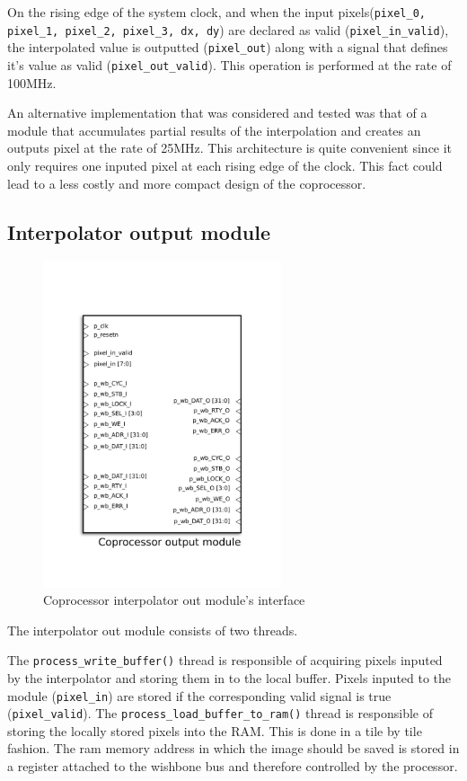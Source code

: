 On the rising edge of the system clock, and when the input pixels(\texttt{pixel\_0, pixel\_1, pixel\_2, pixel\_3, dx, dy}) are declared as valid (\texttt{pixel\_in\_valid}), the interpolated value is outputted (\texttt{pixel\_out}) along with a signal that defines it's value as valid (\texttt{pixel\_out\_valid}). 
This operation is performed at the rate of 100MHz.  


An alternative implementation that was considered and tested was that of a module that accumulates partial results of the interpolation and creates an outputs pixel at the rate of 25MHz. This architecture is quite convenient since it only requires one inputed pixel at each rising edge of the clock. This fact could lead to a less costly and more compact design of the coprocessor.  

\subsection{Interpolator output module}

\begin{figure}[H]
\center
\includegraphics[width=7cm]{figs/INTERPOLATOR_OUT.pdf}
\caption{Coprocessor interpolator out module's interface}
\label{interpo_out_ports}
\end{figure}



The interpolator out module consists of two threads. 

The \texttt{process\_write\_buffer()} thread is responsible of acquiring pixels inputed by the interpolator and storing them in to the local buffer. Pixels inputed to the module (\texttt{pixel\_in}) are stored if the corresponding valid signal is true (\texttt{pixel\_valid}). The \texttt{process\_load\_buffer\_to\_ram()} thread is responsible of storing the locally stored pixels into the RAM. This is done in a tile by tile fashion. The ram memory address in which the image should be saved is stored in a register attached to the wishbone bus and therefore controlled by the processor. 

